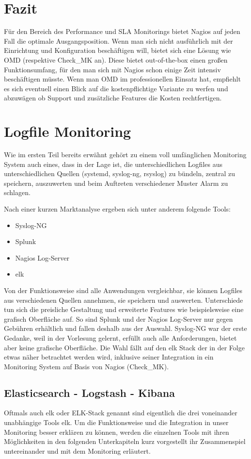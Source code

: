 \documentclass[12pt,a4paper,parskip,listof=totoc,bibliography=totoc]{scrreprt}
\begin{document}
	\section{Fazit}
	Für den Bereich des Performance und SLA Monitorings bietet Nagios auf jeden Fall die optimale Ausgangsposition. Wenn man sich nicht ausführlich mit der Einrichtung und Konfiguration beschäftigen will, bietet sich eine Lösung wie OMD (respektive Check\_MK an). Diese bietet out-of-the-box einen großen Funktionsumfang, für den man sich mit Nagios schon einige Zeit intensiv beschäftigen müsste. Wenn man OMD im professionellen Einsatz hat, empfiehlt es sich eventuell einen Blick auf die kostenpflichtige Variante zu werfen und abzuwägen ob Support und zusätzliche Features die Kosten rechtfertigen.
	\section{Logfile Monitoring}
	Wie im ersten Teil bereits erwähnt gehört zu einem voll umfänglichen Monitoring System auch eines, dass in der Lage ist, die unterschiedlichen Logfiles aus unterschiedlichen Quellen (systemd, syslog-ng, rsyslog) zu bündeln, zentral zu speichern, auszuwerten und beim Auftreten verschiedener Muster Alarm zu schlagen.
	
	Nach einer kurzen Marktanalyse ergeben sich unter anderem folgende Tools:
	\begin{itemize}
		\item Syslog-NG
		\item Splunk
		\item Nagios Log-Server
		\item \acrlong{elk}
	\end{itemize}
	Von der Funktionsweise sind alle Anwendungen vergleichbar, sie können Logfiles aus verschiedenen Quellen annehmen, sie speichern und auswerten. Unterschiede tun sich die preisliche Gestaltung und erweiterte Features wie beispielsweise eine grafisch Oberfläche auf. So sind Splunk und der Nagios Log-Server nur gegen Gebühren erhältlich und fallen deshalb aus der Auswahl. Syslog-NG war der erste Gedanke, weil in der Vorlesung gelernt, erfüllt auch alle Anforderungen, bietet aber keine grafische Oberfläche. Die Wahl fällt auf den \acrshort{elk} Stack der in der Folge etwas näher betrachtet werden wird, inklusive seiner Integration in ein Monitoring System auf Basis von Nagios (Check\_MK).
		
	\subsection{Elasticsearch - Logstash - Kibana}
	Oftmals auch \acrshort{elk} oder ELK-Stack genannt sind eigentlich die drei voneinander unabhängige Tools \acrlong{elk}. Um die Funktionsweise und die Integration in unser Monitoring besser erklären zu können, werden die einzelnen Tools mit ihren Möglichkeiten in den folgenden Unterkapiteln kurz vorgestellt ihr Zusammenspiel untereinander und mit dem Monitoring erläutert.
\end{document}
